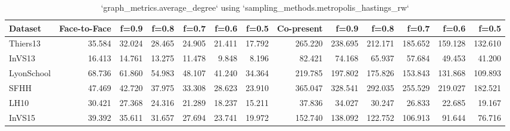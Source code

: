 \begin{table}[ht]
\begin{tabular}{lrrrrrrrrrrrr}
\hline
 Dataset    &   Face-to-Face &   f=0.9 &   f=0.8 &   f=0.7 &   f=0.6 &   f=0.5 &   Co-present &   f=0.9 &   f=0.8 &   f=0.7 &   f=0.6 &   f=0.5 \\
\hline
 Thiers13   &         35.584 &  32.024 &  28.465 &  24.905 &  21.411 &  17.792 &      265.220 & 238.695 & 212.171 & 185.652 & 159.128 & 132.610 \\
 InVS13     &         16.413 &  14.761 &  13.275 &  11.478 &   9.848 &   8.196 &       82.421 &  74.168 &  65.937 &  57.684 &  49.453 &  41.200 \\
 LyonSchool &         68.736 &  61.860 &  54.983 &  48.107 &  41.240 &  34.364 &      219.785 & 197.802 & 175.826 & 153.843 & 131.868 & 109.893 \\
 SFHH       &         47.469 &  42.720 &  37.975 &  33.308 &  28.623 &  23.910 &      365.047 & 328.541 & 292.035 & 255.529 & 219.027 & 182.521 \\
 LH10       &         30.421 &  27.368 &  24.316 &  21.289 &  18.237 &  15.211 &       37.836 &  34.027 &  30.247 &  26.833 &  22.685 &  19.167 \\
 InVS15     &         39.392 &  35.611 &  31.657 &  27.694 &  23.741 &  19.972 &      152.740 & 138.092 & 122.752 & 106.913 &  91.644 &  76.716 \\
\hline
\end{tabular}
\caption{`graph_metrics.average_degree` using `sampling_methods.metropolis_hastings_rw`}
\end{table}